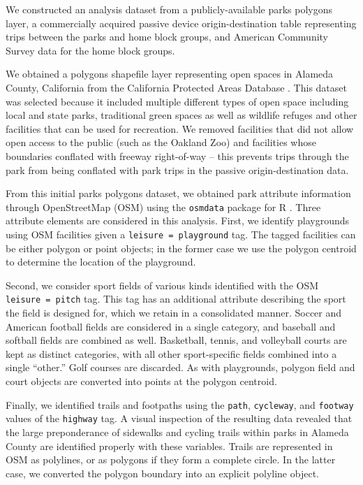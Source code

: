 \documentclass[]{elsarticle} %
\begin{document}
We constructed an analysis dataset from a publicly-available parks polygons
layer, a commercially acquired passive device origin-destination table
representing trips between the parks and home block groups, and American
Community Survey data for the home block groups.

We obtained a polygons shapefile layer representing open spaces in Alameda
County, California from the California Protected Areas Database \citep{cpad2019}.
This dataset was selected because it included multiple different types of open
space including local and state parks, traditional green spaces as well as
wildlife refuges and other facilities that can be used for recreation. We
removed facilities that did not allow open access to the public (such as the
Oakland Zoo) and facilities whose boundaries conflated with freeway right-of-way
-- this prevents trips through the park from being conflated with park trips in
the passive origin-destination data.

From this initial parks polygons dataset, we obtained park attribute information
through OpenStreetMap (OSM) using the \texttt{osmdata} package for R \citep{osmdata}. Three
attribute elements are considered in this analysis. First, we identify playgrounds
using OSM facilities given a \texttt{leisure\ =\ playground} tag. The tagged facilities can
be either polygon or point objects; in the former case we use the polygon centroid
to determine the location of the playground.

Second, we consider sport fields of various kinds identified with the OSM
\texttt{leisure\ =\ pitch} tag. This tag has an additional attribute describing the sport
the field is designed for, which we retain in a consolidated manner. Soccer and
American football fields are considered in a single category, and baseball and
softball fields are combined as well. Basketball, tennis, and volleyball courts
are kept as distinct categories, with all other sport-specific fields combined
into a single ``other.'' Golf courses are discarded. As with playgrounds, polygon
field and court objects are converted into points at the polygon centroid.

Finally, we identified trails and footpaths using the \texttt{path}, \texttt{cycleway}, and
\texttt{footway} values of the \texttt{highway} tag. A visual inspection of the resulting data
revealed that the large preponderance of sidewalks and cycling trails within parks
in Alameda County are identified properly with these variables. Trails are
represented in OSM as polylines, or as polygons if they form a complete circle.
In the latter case, we converted the polygon boundary into an explicit polyline object.
\end{document}

